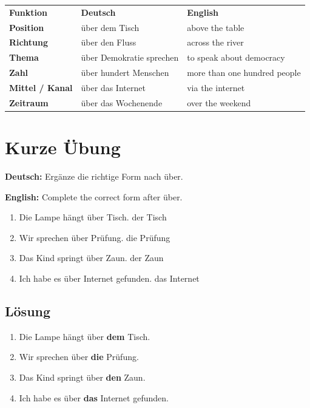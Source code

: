 \documentclass[a4paper,11pt]{article}
\newcommand{\GermanText}[1]{\textbf{Deutsch: }#1\par}
\newcommand{\EnglishText}[1]{{\small\color{SoftGray}\textbf{English: }#1\par}}
\newcommand{\Correct}[1]{\textcolor{HeaderBlueDark}{\textbf{#1}}}
\begin{document}
\begin{tabularx}{\textwidth}{>{\bfseries}p{}X X}
\rowcolor{HeaderBlueDark}
\color{white}\textbf{Funktion} & \color{white}\textbf{Deutsch} & \color{white}\textbf{English} \\
Position & über dem Tisch & above the table \\
Richtung & über den Fluss & across the river \\
Thema & über Demokratie sprechen & to speak about democracy \\
Zahl & über hundert Menschen & more than one hundred people \\
Mittel / Kanal & über das Internet & via the internet \\
Zeitraum & über das Wochenende & over the weekend \\
\end{tabularx}

\section{Kurze Übung}

\GermanText{Ergänze die richtige Form nach \glqq über\grqq.}
\EnglishText{Complete the correct form after \glqq über\grqq.}

\begin{enumerate}
    \item Die Lampe hängt über \underline{\hspace{2.5cm}} Tisch. \hfill der Tisch
    \item Wir sprechen über \underline{\hspace{2.5cm}} Prüfung. \hfill die Prüfung
    \item Das Kind springt über \underline{\hspace{2.5cm}} Zaun. \hfill der Zaun
    \item Ich habe es über \underline{\hspace{2.5cm}} Internet gefunden. \hfill das Internet
\end{enumerate}

\subsection{Lösung}

\begin{enumerate}
    \item Die Lampe hängt über \Correct{dem} Tisch.
    \item Wir sprechen über \Correct{die} Prüfung.
    \item Das Kind springt über \Correct{den} Zaun.
    \item Ich habe es über \Correct{das} Internet gefunden.
\end{enumerate}
\end{document}

